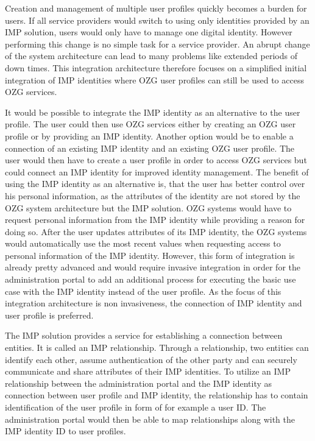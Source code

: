 \documentclass[
     12pt,         %
     a4paper,      %
     BCOR=10mm,version=first,     %
     DIV=14,version=first,        %
     ]{scrreprt}
\begin{document}
Creation and management of multiple user profiles quickly becomes a burden for users. If all service providers would switch to using only identities provided by an IMP solution, users would only have to manage one digital identity. However performing this change is no simple task for a service provider. An abrupt change of the system architecture can lead to many problems like extended periods of down times. This integration architecture therefore focuses on a simplified initial integration of IMP identities where OZG user profiles can still be used to access OZG services.

It would be possible to integrate the IMP identity as an alternative to the user profile. The user could then use OZG services either by creating an OZG user profile or by providing an IMP identity. Another option would be to enable a connection of an existing IMP identity and an existing OZG user profile. The user would then have to create a user profile in order to access OZG services but could connect an IMP identity for improved identity management. The benefit of using the IMP identity as an alternative is, that the user has better control over his personal information, as the attributes of the identity are not stored by the OZG system architecture but the IMP solution. OZG systems would have to request personal information from the IMP identity while providing a reason for doing so. After the user updates attributes of its IMP identity, the OZG systems would automatically use the most recent values when requesting access to personal information of the IMP identity. However, this form of integration is already pretty advanced and would require invasive integration in order for the administration portal to add an additional process for executing the basic use case with the IMP identity instead of the user profile. As the focus of this integration architecture is non invasiveness, the connection of IMP identity and user profile is preferred.

The IMP solution provides a service for establishing a connection between entities. It is called an IMP relationship. Through a relationship, two entities can identify each other, assume authentication of the other party and can securely communicate and share attributes of their IMP identities. To utilize an IMP relationship between the administration portal and the IMP identity as connection between user profile and IMP identity, the relationship has to contain identification of the user profile in form of for example a user ID. The administration portal would then be able to map relationships along with the IMP identity ID to user profiles.
\end{document}
